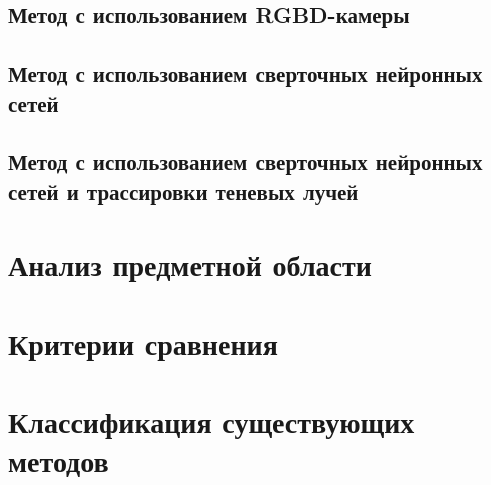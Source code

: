 \subsection{Метод с использованием RGBD-камеры}

\subsection{Метод с использованием сверточных нейронных сетей}

\subsection{Метод с использованием сверточных нейронных сетей и трассировки теневых лучей}

\section{Анализ предметной области}



\section{Критерии сравнения}



\section{Классификация существующих методов}


